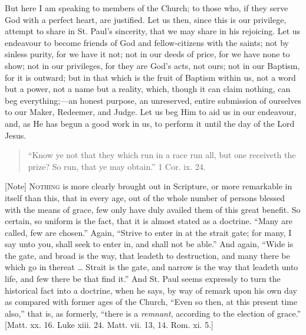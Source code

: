 But here I am speaking to members of the Church; to those who, if
they serve God with a perfect heart, are justified. Let us then, since
this is our privilege, attempt to share in St. Paul's sincerity, that
we may share in his rejoicing. Let us endeavour to become friends of
God and fellow-citizens with the saints; not by sinless purity, for we
have it not; not in our deeds of price, for we have none to show;
not in our privileges, for they are God's acts, not ours; not in our
Baptism, for it is outward; but in that which is the fruit of Baptism
within us, not a word but a power, not a name but a reality, which,
though it can claim nothing, can beg everything;—an honest purpose,
an unreserved, entire submission of ourselves to our Maker, Redeemer,
and Judge. Let us beg Him to aid us in our endeavour, and, as He has
begun a good work in us, to perform it until the day of the Lord
Jesus.


\begin{quote}

``Know ye not that they which run in a
race run all, but one receiveth the prize? So run, that ye may
obtain.'' 1 Cor. ix. 24.

\end{quote}

[Note] N\textsc{othing} is more clearly
brought out in Scripture, or more remarkable in itself than this, that
in every age, out of the whole number of persons blessed with the
means of grace, few only have duly availed them of this great benefit.
So certain, so uniform is the fact, that it is almost stated as a
doctrine. ``Many are called, few are chosen.'' Again,
``Strive to enter in at the strait gate; for many, I say unto you,
shall seek to enter in, and shall not be able.'' And again,
``Wide is the gate, and broad is the way, that leadeth to
destruction, and many there be which go in thereat … Strait is the
gate, and narrow is the way that leadeth unto life, and few there be
that find it.'' And St. Paul seems expressly to turn the
historical fact into a doctrine, when he says, by way of remark upon
his own day as compared with former ages of the Church, ``Even so
then, at this present time also,'' that is, as formerly,
``there is a \emph{remnant}, according to the election of
grace.'' [Matt. xx. 16. Luke xiii. 24. Matt. vii. 13, 14. Rom. xi.
5.]

